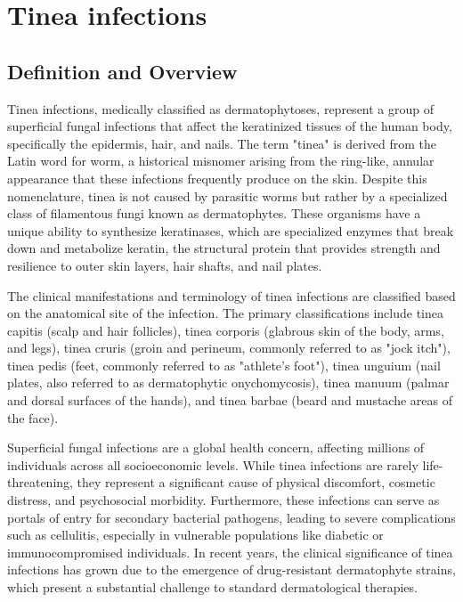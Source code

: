 \chapter{Tinea infections}

\section*{Definition and Overview}
Tinea infections, medically classified as dermatophytoses, represent a group of superficial fungal infections that affect the keratinized tissues of the human body, specifically the epidermis, hair, and nails. The term "tinea" is derived from the Latin word for worm, a historical misnomer arising from the ring-like, annular appearance that these infections frequently produce on the skin. Despite this nomenclature, tinea is not caused by parasitic worms but rather by a specialized class of filamentous fungi known as dermatophytes. These organisms have a unique ability to synthesize keratinases, which are specialized enzymes that break down and metabolize keratin, the structural protein that provides strength and resilience to outer skin layers, hair shafts, and nail plates.

The clinical manifestations and terminology of tinea infections are classified based on the anatomical site of the infection. The primary classifications include tinea capitis (scalp and hair follicles), tinea corporis (glabrous skin of the body, arms, and legs), tinea cruris (groin and perineum, commonly referred to as "jock itch"), tinea pedis (feet, commonly referred to as "athlete's foot"), tinea unguium (nail plates, also referred to as dermatophytic onychomycosis), tinea manuum (palmar and dorsal surfaces of the hands), and tinea barbae (beard and mustache areas of the face).

Superficial fungal infections are a global health concern, affecting millions of individuals across all socioeconomic levels. While tinea infections are rarely life-threatening, they represent a significant cause of physical discomfort, cosmetic distress, and psychosocial morbidity. Furthermore, these infections can serve as portals of entry for secondary bacterial pathogens, leading to severe complications such as cellulitis, especially in vulnerable populations like diabetic or immunocompromised individuals. In recent years, the clinical significance of tinea infections has grown due to the emergence of drug-resistant dermatophyte strains, which present a substantial challenge to standard dermatological therapies.

